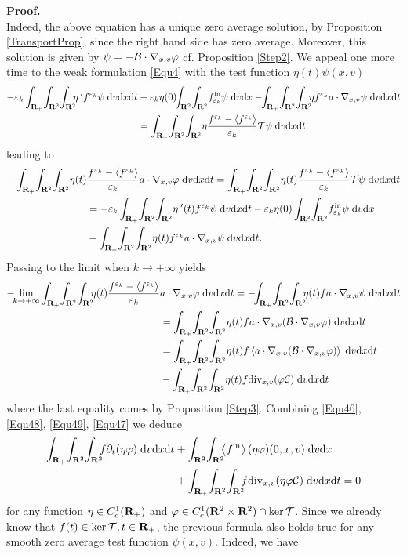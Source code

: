 \documentclass[12pt, a4paper]{article}
\providecommand\mathbb{\bf}
\newcommand\R{{\mathbb R}}
\newcounter{steps}
\newenvironment{proof}[1][]{%
\par\medbreak\setcounter{steps}{0}
{\noindent\bfseries Proof#1. }} {\hfill\fbox{\ }\medbreak}
\newcommand{\intxv}[1]{
\int _{\R^2}\!\int _{\R^2} \!#1 \;\mathrm{d}v\mathrm{d}x}
\newcommand{\inttxv}[1]{
\int _{\R_+} \! \int _{\R^2}\!\int _{\R^2} \!#1 \;\mathrm{d}v\mathrm{d}x\mathrm{d}t}
\newcommand{\coct}[0]{
C^1 _c (\R_+)}
\newcommand{\cocxv}[0]{
C^1 _c (\R ^2 \times \R ^2)}
\newcommand{\eps}[0]{
\varepsilon}
\newcommand{\epsk}[0]{
\varepsilon _k}
\newcommand{\fek}[0]{
f ^{\varepsilon _k}}
\newcommand{\fin}[0]{
f ^{\mathrm{in}}}
\newcommand{\finek}[0]{
f ^{\mathrm{in}}_{\varepsilon _k}}
\newcommand{\Divxv}[0]{
\mathrm{div}_{x,v}}
\newcommand{\nxv}[0]{
\nabla_{x,v}}
\newcommand{\limk}[0]{
\lim _{k \to +\infty}}
\newcommand{\ave}[1]{
\left \langle #1 \right \rangle }
\begin{document}
\begin{proof}
\[\]
Indeed, the above equation has a unique zero average solution, by Proposition \ref{TransportProp}, since the right hand side has zero average. Moreover, this solution is given by $\psi = - {\cal B} \cdot \nxv \varphi$ cf. Proposition \ref{Step2}. We appeal one more time to the weak formulation \eqref{Equ4} with the test function $\eta (t) \psi (x,v)$
\begin{align*}
- \eps _k \inttxv{\!\!\eta ^{\;\prime}  \fek \psi }  & -  \epsk \eta (0) \!\!\intxv{\finek \psi } -  \!\!\inttxv{\!\!\eta  \fek a \cdot \nxv \psi }  \\
& = \inttxv{\eta  \frac{\fek - \ave{\fek}}{\epsk} {\cal T} \psi }
\end{align*}
leading to 
\begin{align*}
 -  \inttxv{\eta (t) & \frac{\fek - \ave{\fek}}{\epsk}  a \cdot \nxv \varphi }  =  
\inttxv{\eta (t) \frac{\fek - \ave{\fek}}{\epsk} {\cal T} \psi } \\
& =  - \epsk \inttxv{\eta ^{\;\prime}(t) \fek \psi } 
-  \epsk \eta (0) \intxv{\finek \psi } \\
& - \inttxv{\eta (t) \fek a \cdot \nxv \psi }.
\end{align*}
Passing to the limit when $k \to +\infty$ yields
\begin{align}
\label{Equ47}  - \!\!\limk \inttxv{\!\!\eta (t)  \frac{\fek - \ave{\fek}}{\epsk}  & a \cdot \nxv \varphi }  =  - \!\!\inttxv{\!\!\eta (t)  f a \cdot \nxv \psi }  \nonumber \\
& =  \inttxv{\eta (t)  f a \cdot \nxv ( {\cal B} \cdot \nxv \varphi ) }  \nonumber \\
& =  \inttxv{\eta (t) f \ave{a \cdot \nxv ( {\cal B} \cdot \nxv \varphi )}}  \nonumber \\
& - \inttxv{\eta (t) f \Divxv ( \varphi {\cal C}) }
\end{align}
where the last equality comes by Proposition \ref{Step3}. Combining \eqref{Equ46}, \eqref{Equ48}, \eqref{Equ49}, \eqref{Equ47} we deduce 
\begin{align}
\label{LimitModelForm}
 \inttxv{\!\!f \partial _t ( \eta \varphi )} & + \intxv{\!\!\ave{\fin} (\eta \varphi )(0,x,v)} \\
& +  \inttxv{\!\!f \Divxv (\eta \varphi {\cal C})} = 0 \nonumber
\end{align}
for any function $\eta \in \coct{}$ and $\varphi \in \cocxv{} \cap \ker {\cal T}$. Since we already know that $f(t) \in \ker {\cal T}, t \in \R_+$, the previous formula also holds true for any smooth zero average test function $\psi (x,v)$. Indeed, we have

\end{proof}
\end{document}
